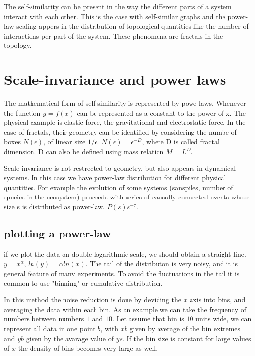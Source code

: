 The self-similarity can be present in the way the different parts of a system interact with each other. This is the case with self-similar graphs and the power-law scaling appers in the distribution of topological quantities like the number of interactions per part  of the system. These phenomena are fractals in the topology. 

\section{Scale-invariance and power laws}

The mathematical form of self similarity is represented by powe-laws. Whenever the function $y = f(x)$ can be represented as a constant to the power of x. The physical example is elastic force, the gravitational and electrostatic force. In the case of fractals, their geometry can be identified by considering the numbe of boxes $N(\epsilon)$, of linear size $1/\epsilon$. $N(\epsilon) = \epsilon ^{-D}$, where D is called fractal dimension. D can also be defined using mass relation $M = L^ D$.

Scale invariance is not restrected to geometry, but also appears in dynamical systems. In this case we have power-law distribution for different physical quantities. For example the evolution of some systems (sanspiles, number of species in the ecosystem) proceeds  with series of causally connected events whose size s is distributed as power-law. $P(s) s^{-\tau}$.

\subsection{plotting a power-law}

if we plot the data on double logarithmic scale, we should obtain a straight line. $y = x^{\alpha}$, $ln(y) = \alpha ln(x)$. The tail of the distributon is very noisy, and it is general feature of many experiments. To avoid the fluctuations in the tail it is common to use "binning" or cumulative distribution. 

In this method the noise reduction is done by deviding the $x$ axis into bins, and averaging the data within each bin. As an example we can take the frequency of numbers between numbers $1$ and $10$. Let assume that bin is $10$ units wide, we can represent all data in one point $b$, with $xb$ given by average of the bin extremes and $yb$ given by the avarage value of $ys$. If the bin size is constant for large values of $x$ the density of bins becomes very large as well. 

